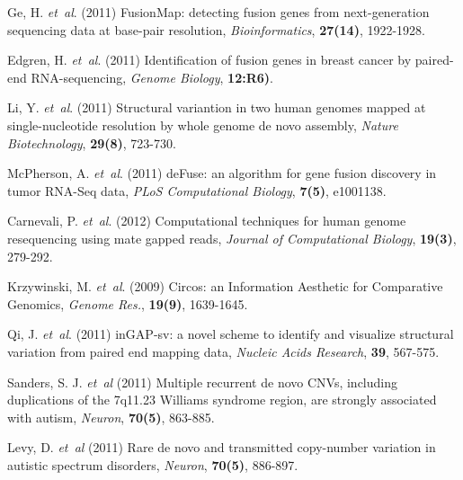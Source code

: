 \begin{thebibliography}{}
 Ge, H. {\it et~al}. (2011) FusionMap: detecting fusion genes from next-generation sequencing data at base-pair resolution, {\it Bioinformatics}, {\bf 27(14)}, 1922-1928.

 Edgren, H. {\it et~al}. (2011) Identification of fusion genes in breast cancer by paired-end RNA-sequencing, {\it Genome Biology}, {\bf 12:R6)}.

 Li, Y. {\it et~al}. (2011) Structural variantion in two human genomes mapped at single-nucleotide resolution by whole genome de novo assembly, {\it Nature Biotechnology}, {\bf 29(8)}, 723-730.

 McPherson, A. {\it et~al}. (2011) deFuse: an algorithm for gene fusion discovery in tumor RNA-Seq data, {\it PLoS Computational Biology}, {\bf 7(5)}, e1001138.

 Carnevali, P. {\it et~al}. (2012) Computational techniques for human genome resequencing using mate gapped reads, {\it Journal of Computational Biology}, {\bf 19(3)}, 279-292.

 Krzywinski, M. {\it et~al}. (2009) Circos: an Information Aesthetic for Comparative Genomics, {\it Genome Res.}, {\bf 19(9)}, 1639-1645.

 Qi, J. {\it et~al}. (2011) inGAP-sv: a novel scheme to identify and visualize structural variation from paired end mapping data, {\it Nucleic Acids Research}, {\bf 39}, 567-575.


 Sanders, S. J. {\it et~al} (2011) Multiple recurrent de novo CNVs, including duplications of the 7q11.23 Williams syndrome region, are strongly associated with autism, {\it Neuron}, {\bf 70(5)}, 863-885.

 Levy, D. {\it et~al} (2011) Rare de novo and transmitted copy-number variation in autistic spectrum disorders, {\it Neuron}, {\bf 70(5)}, 886-897.


\end{thebibliography}
